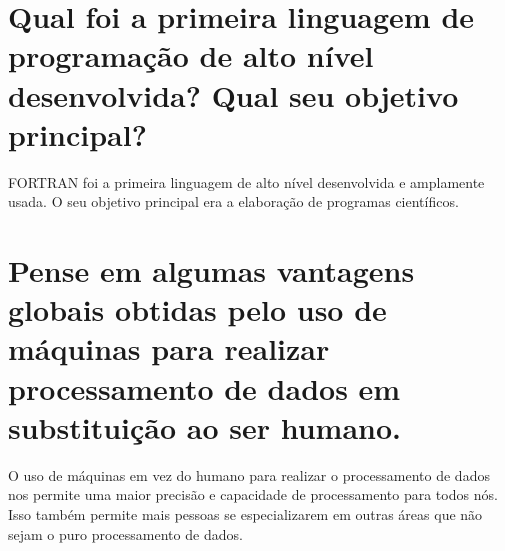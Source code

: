 \documentclass[
	12pt,				%
	openright,			%
	twoside,			%
	a4paper,			%
	english,			%
	french,				%
	spanish,			%
	brazil				%
	]{abntex2}
\begin{document}
\section{Qual foi a primeira linguagem de programação de alto nível desenvolvida? Qual seu objetivo principal?}
\label{sec:org46bf475}
FORTRAN foi a primeira linguagem de alto nível desenvolvida e amplamente usada.
O seu objetivo principal era a elaboração de programas científicos.
\section{Pense em algumas vantagens globais obtidas pelo uso de máquinas para realizar processamento de dados em substituição ao ser humano.}
\label{sec:org14cf0d2}
O uso de máquinas em vez do humano para realizar o processamento de dados nos
permite uma maior precisão e capacidade de processamento para todos nós. Isso
também permite mais pessoas se especializarem em outras áreas que não sejam o
puro processamento de dados.
\end{document}
